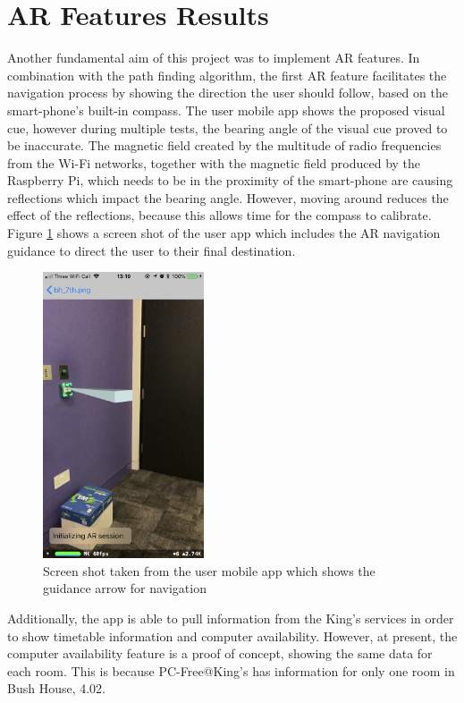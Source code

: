 \section{AR Features Results}
\label{sec:ar-results}
Another fundamental aim of this project was to implement AR features. In combination with the path finding algorithm, the first AR feature facilitates the navigation process by showing the direction the user should follow, based on the smart-phone's built-in compass. The user mobile app shows the proposed visual cue, however during multiple tests, the bearing angle of the visual cue proved to be inaccurate. The magnetic field created by the multitude of radio frequencies from the Wi-Fi networks, together with the magnetic field produced by the Raspberry Pi, which needs to be in the proximity of the smart-phone are causing reflections which impact the bearing angle. However, moving around reduces the effect of the reflections, because this allows time for the compass to calibrate. Figure \ref{fig:ar-arrow} shows a screen shot of the user app which includes the AR navigation guidance to direct the user to their final destination.

\begin{figure}[H]
    \centering
    \includegraphics[width=180px, height=320px]{Evaluation/AR-arrow.png}
    \caption{Screen shot taken from the user mobile app which shows the guidance arrow for navigation}
    \label{fig:ar-arrow}
\end{figure}

\newpage
Additionally, the app is able to pull information from the King's services in order to show timetable information and computer availability. However, at present, the computer availability feature is a proof of concept, showing the same data for each room. This is because PC-Free@King's has information for only one room in Bush House, 4.02.

